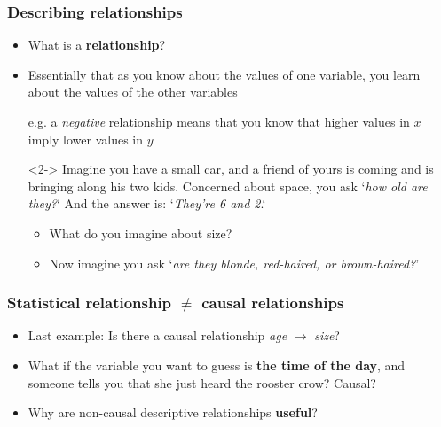 \documentclass[aspectratio=43]{beamer}
\begin{document}
\begin{frame}
\frametitle{Describing relationships}
\centering

\begin{itemize}
  \item What is a \textbf{relationship}?
  \item Essentially that as you know about the values of one variable, you learn about the values of the other variables
  \item[] e.g. a \textit{negative} relationship means that you know that higher values in $x$ imply lower values in $y$
  \item[]
  \item[]<2-> Imagine you have a small car, and a friend of yours is coming and is bringing along his two kids. Concerned about space, you ask `\textit{how old are they?}` And the answer is: `\textit{They're 6 and 2}.`
  \begin{itemize}
    \item What do you imagine about size?
    \item<3-> Now imagine you ask `\textit{are they blonde, red-haired, or brown-haired?}'
  \end{itemize}
\end{itemize}

\end{frame}

\begin{frame}
\frametitle{Statistical relationship $\neq$ causal relationships}
\centering

\begin{itemize}
  \item<1-> Last example: Is there a causal relationship \textit{age} $\rightarrow$ \textit{size}?
  \item<2-> What if the variable you want to guess is \textbf{the time of the day}, and someone tells you that she just heard the rooster crow? Causal?
  \item[]
  \item<3-> Why are non-causal descriptive relationships \textbf{useful}?
\end{itemize}

\end{frame}

%
%
\end{document}
